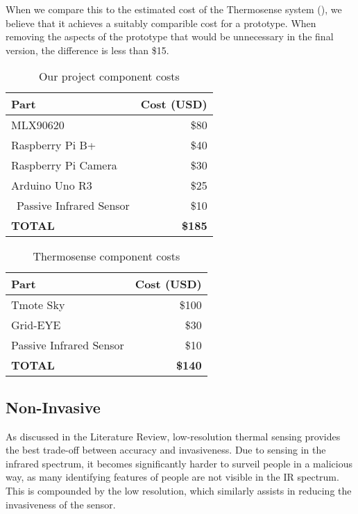 \documentclass[../thesis/thesis.tex]{subfiles}
\begin{document}
When we compare this to the estimated cost of the Thermosense system (), we believe that it achieves a suitably comparible cost for a prototype. When removing the aspects of the prototype that would be unnecessary in the final version, the difference is less than \$15.

\begin{table}
\centering
\begin{tabular}[H]{|l|r|}
\hline
\textbf{Part} & \textbf{Cost (USD)} \\ \hline
MLX90620 & \$80 \\ \hline
Raspberry Pi B+ &  \$40 \\ \hline
Raspberry Pi Camera &  \$30 \\ \hline
Arduino Uno R3 & \$25 \\ \
Passive Infrared Sensor & \$10 \\ \hline
\textbf{TOTAL} & \textbf{\$185} \\ \hline
\end{tabular}
\caption{Our project component costs}
\label{tab:sensor:cost}
\end{table}

\begin{table}
\centering
\begin{tabular}[H]{|l|r|}
\hline
\textbf{Part} & \textbf{Cost (USD)} \\ \hline
Tmote Sky & \$100 \\ \hline
Grid-EYE & \$30 \\ \hline
Passive Infrared Sensor & \$10 \\ \hline
\textbf{TOTAL} & \textbf{\$140} \\ \hline
\end{tabular}
\caption{Thermosense component costs}
\label{tab:sensor:thermosensecost}
\end{table}

\subsection{Non-Invasive}
As discussed in the Literature Review, low-resolution thermal sensing provides the best trade-off between accuracy and invasiveness. Due to sensing in the infrared spectrum, it becomes significantly harder to surveil people in a malicious way, as many identifying features of people are not visible in the IR spectrum. This is compounded by the low resolution, which similarly assists in reducing the invasiveness of the sensor.
\end{document}
